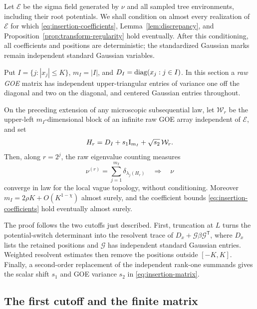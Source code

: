 Let \(\mathcal E\) be the sigma field generated by \(\nu\) and all
sampled tree environments, including their root potentials. We shall
condition on almost every realization of \(\mathcal E\) for which
\eqref{eq:insertion-coefficients}, Lemma~\ref{lem:discrepancy}, and
Proposition~\ref{prop:transform-regularity} hold eventually.
After this conditioning, all coefficients and positions are deterministic;
the standardized Gaussian marks remain independent standard Gaussian variables.

Put \(I=\{j:|x_j|\le K\}\), \(m_I=|I|\), and
\(D_I=\operatorname{diag}(x_j:j\in I)\). In this section a \emph{raw GOE} matrix
has independent upper-triangular entries of variance one off the diagonal
and two on the diagonal, and centered Gaussian entries throughout.

\begin{proposition}\label{prop:gaussian-insertion}
On the preceding extension of any microscopic subsequential law, let
\(\mathcal W_r\) be the upper-left \(m_I\)-dimensional block of an
infinite raw GOE array independent of \(\mathcal E\), and set
\begin{equation}\label{eq:insertion-matrix}
 H_r=D_I+s_1\mathrm I_{m_I}+\sqrt{s_2}\,\mathcal W_r.
\end{equation}
Then, along \(r=2^j\), the raw eigenvalue counting measures
\[
 \nu^{(r)}=\sum_{j=1}^{m_I}\delta_{\lambda_j(H_r)}
 \quad\Longrightarrow\quad\nu
\]
converge in law for the local vague topology, without conditioning.
Moreover \(m_I=2\rho K+O(K^{1-\chi})\) almost surely, and the
coefficient bounds \eqref{eq:insertion-coefficients} hold eventually
almost surely.
\end{proposition}

The proof follows the two cutoffs just described. First, truncation at
\(L\) turns the potential-switch determinant into the resolvent trace of
\(D_x+\mathcal G\beta\mathcal G^{\mathsf T}\), where \(D_x\) lists the
retained positions and \(\mathcal G\) has independent standard Gaussian
entries. Weighted resolvent estimates then remove the positions outside
\([-K,K]\). Finally, a second-order replacement of the independent
rank-one summands gives the scalar shift \(s_1\) and GOE variance \(s_2\)
in \eqref{eq:insertion-matrix}.

\subsection{The first cutoff and the finite matrix}

